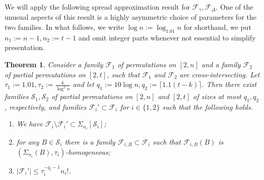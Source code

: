 \documentclass[11pt]{extarticle}
\numberwithin{equation}{section} %
\theoremstyle{plain}
\newtheorem{thm}{Theorem}
\theoremstyle{definition}
\newcommand{\FF}{\mathcal{F}}
\newcommand{\ff}{\mathcal{F}}
\newcommand{\m}{\mathcal}
\begin{document}
We will apply the following spread approximation result for $\ff_\gamma, \FF_\Delta$. One of the unusual aspects of this result is a highly asymmetric choice of parameters for the two families.  In what follows, we write $\log{n}:=\log_{1.01}{n}$ for shorthand, we put $n_1 := n-1, n_2 := t-1$ and omit integer parts whenever not essential to simplify presentation. 
\begin{thm}\label{thmapprox}
    Consider a family $\FF_1$  of permutations on $[2,n]$ and a family $\ff_2$ of partial permutations on $[2,t]$, such that $\FF_1$ and $\FF_2$ are cross-intersecting. 
    Let $\tau_1 := 1.01, \tau_2:=\frac{k}{\log^2{n}}$ and let $q_1:=10\log{n}, q_2:=\lceil1.1(t-k)\rceil.$ Then there exist families $\m{S}_1, \m S_2$ of partial permutations on  $[2,n]$ and $[2,t]$ of sizes at most $q_1,q_2$, respectively, and families $\FF_i' \subset \FF_i$ for $i\in\{1,2\}$ such that the following holds.
    \begin{enumerate}[label=(\roman*)]
        \item We have $\FF_i \setminus \FF_i'\subset \Sigma_{n_i}[\m S_i]$;
        \item for any $B \in \m{S}_i$ there is a family $\FF_{i, B} \subset \FF_i$ such that $\FF_{i,B}(B)$ is $(\Sigma_{n_i}(B), \tau_i)$-homogeneous;
        \item $|\FF_i'| \leq \tau_i^{-q_i-1}n_i!$.
    \end{enumerate}
\end{thm}
\end{document}
